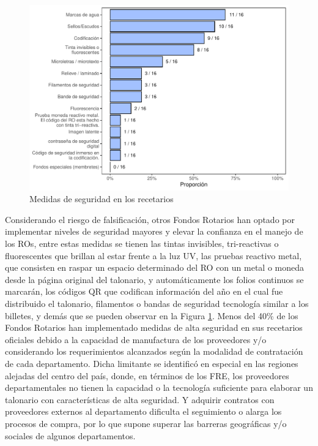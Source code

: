 \documentclass[
]{book}
\begin{document}
\begin{figure}
\includegraphics[width=0.9\linewidth]{InformeFinal_files/figure-latex/MedidasSeguridadRec-1} \caption{Medidas de seguridad en los recetarios}\label{fig:MedidasSeguridadRec}
\end{figure}

Considerando el riesgo de falsificación, otros Fondos Rotarios han optado por implementar niveles de seguridad mayores y elevar la confianza en el manejo de los ROs, entre estas medidas se tienen las tintas invisibles, tri-reactivas o fluorescentes que brillan al estar frente a la luz UV, las pruebas reactivo metal, que consisten en raspar un espacio determinado del RO con un metal o moneda desde la página original del talonario, y automáticamente los folios continuos se marcarán, los códigos QR que codifican información del año en el cual fue distribuido el talonario, filamentos o bandas de seguridad tecnología similar a los billetes, y demás que se pueden observar en la Figura \ref{fig:MedidasSeguridadRec}. Menos del 40\% de los Fondos Rotarios han implementado medidas de alta seguridad en sus recetarios oficiales debido a la capacidad de manufactura de los proveedores y/o considerando los requerimientos alcanzados según la modalidad de contratación de cada departamento. Dicha limitante se identificó en especial en las regiones alejadas del centro del país, donde, en términos de los FRE, los proveedores departamentales no tienen la capacidad o la tecnología suficiente para elaborar un talonario con características de alta seguridad. Y adquirir contratos con proveedores externos al departamento dificulta el seguimiento o alarga los procesos de compra, por lo que supone superar las barreras geográficas y/o sociales de algunos departamentos.
\end{document}
